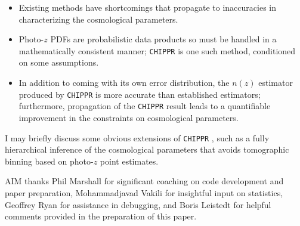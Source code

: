 \documentclass[preprint]{aastex}
\newcommand{\chippr}{\texttt{CHIPPR} }
\begin{document}
\begin{itemize}
	\item Existing methods have shortcomings that propagate to inaccuracies 
in characterizing the cosmological parameters.\\
	\item Photo-$z$ PDFs are probabilistic data products so must be handled 
in a mathematically consistent manner; \chippr is one such method, conditioned 
on some assumptions.
	\item In addition to coming with its own error distribution, the $n(z)$ 
estimator produced by \chippr is more accurate than established estimators; 
furthermore, propagation of the \chippr result leads to a quantifiable 
improvement in the constraints on cosmological parameters.
\end{itemize}

I may briefly discuss some obvious extensions of \chippr, such as a fully 
hierarchical inference of the cosmological parameters that avoids tomographic 
binning based on photo-$z$ point estimates.



\begin{acknowledgements}
AIM thanks Phil Marshall for significant coaching on code development and paper 
preparation, Mohammadjavad Vakili for insightful input on statistics, Geoffrey 
Ryan for assistance in debugging, and Boris Leistedt for helpful comments 
provided in the preparation of this paper.
\end{acknowledgements}



\end{document}
